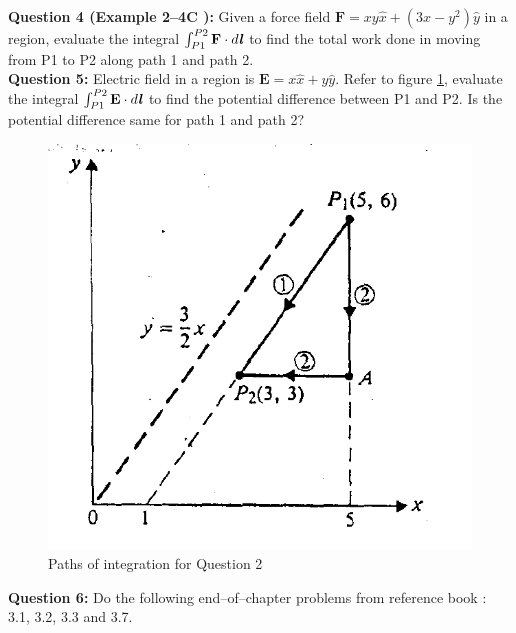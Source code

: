 \documentclass[12pt,a4paper]{article}
\begin{document}
\newpage
\noindent\textbf{Question 4 (Example 2--4C \cite[Example 2--4, page 23]{Cheng}):} Given a force field $\textbf{F}=xy\hat x+(3x-y^2)\hat y$ in a region, evaluate the integral $\int_{P1}^{P2}\textbf{F}\cdot d\textbf{\textit{l}}$ to find the total work done in moving from P1 to P2 along path 1 and path 2.\\[0.2cm]
\noindent\textbf{Question 5:} Electric field in a region is $\textbf{E}=x\hat x+y\hat y$. Refer to figure \ref{Cheng-integral}, evaluate the integral $\int_{P1}^{P2}\textbf{E}\cdot d\textbf{\textit{l}}$ to find the potential difference between P1 and P2. Is the potential difference same for path 1 and path 2?
\begin{figure}[H]
\centering
\includegraphics[scale=0.6]{Figure2-10Cheng.png}
\caption{Paths of integration for Question 2 \cite[Figure 2--10, page 23]{Cheng}}
\label{Cheng-integral}
\end{figure}
\noindent\textbf{Question 6:} Do the following end--of--chapter problems from reference book \cite[Page 93 and 94]{Sadiku}: 3.1, 3.2, 3.3 and 3.7.


\end{document}
